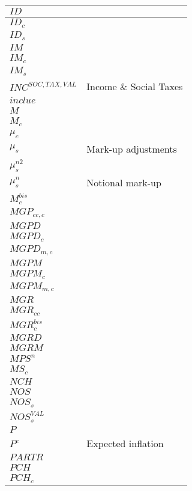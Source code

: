 \documentclass[12pt]{article}
\numberwithin{equation}{section}
\begin{document}
\begin{longtable}{@{}p{4cm}p{9cm}@{}}
$ID$ &  \\
 \midrule 
$ID_{c}$ &  \\
 \midrule 
$ID_{s}$ &  \\
 \midrule 
$IM$ &  \\
 \midrule 
$IM_{c}$ &  \\
 \midrule 
$IM_{s}$ &  \\
 \midrule 
$INC^{SOC,TAX,VAL}$ & Income \& Social Taxes \\
 \midrule 
$inclue$ &  \\
 \midrule 
$M$ &  \\
 \midrule 
$M_{c}$ &  \\
 \midrule 
$\mu_{c}$ &  \\
 \midrule 
$\mu_{s}$ & Mark-up adjustments \\
 \midrule 
$\mu^{n2}_{s}$ &  \\
 \midrule 
$\mu^{n}_{s}$ & Notional mark-up \\
 \midrule 
$M^{bis}_{c}$ &  \\
 \midrule 
$MGP_{cc, c}$ &  \\
 \midrule 
$MGPD$ &  \\
 \midrule 
$MGPD_{c}$ &  \\
 \midrule 
$MGPD_{m, c}$ &  \\
 \midrule 
$MGPM$ &  \\
 \midrule 
$MGPM_{c}$ &  \\
 \midrule 
$MGPM_{m, c}$ &  \\
 \midrule 
$MGR$ &  \\
 \midrule 
$MGR_{cc}$ &  \\
 \midrule 
$MGR^{bis}_{c}$ &  \\
 \midrule 
$MGRD$ &  \\
 \midrule 
$MGRM$ &  \\
 \midrule 
$MPS^{n}$ &  \\
 \midrule 
$MS_{c}$ &  \\
 \midrule 
$NCH$ &  \\
 \midrule 
$NOS$ &  \\
 \midrule 
$NOS_{s}$ &  \\
 \midrule 
$NOS^{VAL}_{s}$ &  \\
 \midrule 
$P$ &  \\
 \midrule 
$P^{e}$ & Expected inflation \\
 \midrule 
$PARTR$ &  \\
 \midrule 
$PCH$ &  \\
 \midrule 
$PCH_{c}$ &  \\
 \midrule 

\end{longtable}
\end{document}

